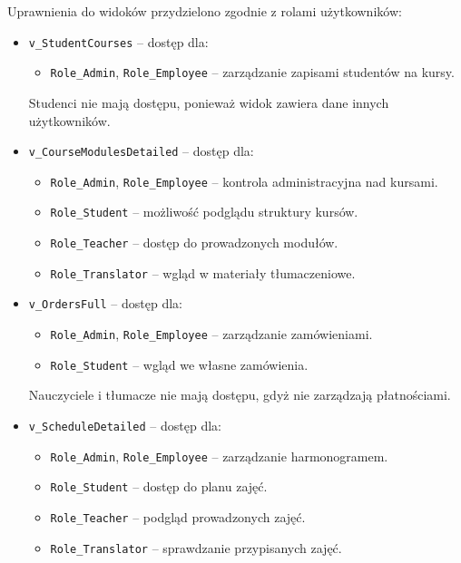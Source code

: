 \documentclass[12pt]{article}
\begin{document}
\noindent Uprawnienia do widoków przydzielono zgodnie z rolami użytkowników:

\begin{itemize}
    \item \texttt{v\_StudentCourses} -- dostęp dla:
        \begin{itemize}
            \item \texttt{Role\_Admin}, \texttt{Role\_Employee} -- zarządzanie zapisami studentów na kursy.
        \end{itemize}
        Studenci nie mają dostępu, ponieważ widok zawiera dane innych użytkowników.

    \item \texttt{v\_CourseModulesDetailed} -- dostęp dla:
        \begin{itemize}
            \item \texttt{Role\_Admin}, \texttt{Role\_Employee} -- kontrola administracyjna nad kursami.
            \item \texttt{Role\_Student} -- możliwość podglądu struktury kursów.
            \item \texttt{Role\_Teacher} -- dostęp do prowadzonych modułów.
            \item \texttt{Role\_Translator} -- wgląd w materiały tłumaczeniowe.
        \end{itemize}

    \item \texttt{v\_OrdersFull} -- dostęp dla:
        \begin{itemize}
            \item \texttt{Role\_Admin}, \texttt{Role\_Employee} -- zarządzanie zamówieniami.
            \item \texttt{Role\_Student} -- wgląd we własne zamówienia.
        \end{itemize}
        Nauczyciele i tłumacze nie mają dostępu, gdyż nie zarządzają płatnościami.

    \item \texttt{v\_ScheduleDetailed} -- dostęp dla:
        \begin{itemize}
            \item \texttt{Role\_Admin}, \texttt{Role\_Employee} -- zarządzanie harmonogramem.
            \item \texttt{Role\_Student} -- dostęp do planu zajęć.
            \item \texttt{Role\_Teacher} -- podgląd prowadzonych zajęć.
            \item \texttt{Role\_Translator} -- sprawdzanie przypisanych zajęć.
        \end{itemize}


\end{itemize}
\end{document}
